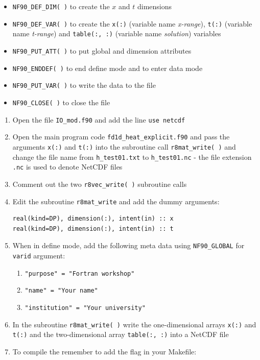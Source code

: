 \documentclass[12pt]{article}
\begin{document}
\begin{enumerate}
\begin{itemize}
\item\texttt{NF90\_DEF\_DIM( )} to create the $x$ and $t$ dimensions
\item\texttt{NF90\_DEF\_VAR( )} to create the \texttt{x(:)} (variable name {\em x-range}), \texttt{t(:)} (variable name
  {\em t-range}) and \texttt{table(:, :)} (variable name {\em solution}) variables
\item\texttt{NF90\_PUT\_ATT( )} to put global and dimension attributes
\item\texttt{NF90\_ENDDEF( )} to end define mode and to enter data mode
\item\texttt{NF90\_PUT\_VAR( )} to write the data to the file
\item\texttt{NF90\_CLOSE( )} to close the file
\end{itemize}
\begin{enumerate}
\item Open the file \texttt{IO\_mod.f90} and add the line \texttt{use netcdf}
\item Open the main program code \texttt{fd1d\_heat\_explicit.f90} and pass the arguments \texttt{x(:)} and
  \texttt{t(:)} into the subroutine call \texttt{r8mat\_write( )} and change the file name from \texttt{h\_test01.txt}
  to \texttt{h\_test01.nc} - the file extension \texttt{.nc} is used to denote NetCDF files
\item Comment out the two \texttt{r8vec\_write( )} subroutine calls
\item Edit the subroutine \texttt{r8mat\_write} and add the dummy arguments:
\begin{verbatim}
real(kind=DP), dimension(:), intent(in) :: x
real(kind=DP), dimension(:), intent(in) :: t
\end{verbatim}
\item When in define mode, add the following meta data using \texttt{NF90\_GLOBAL} for \texttt{varid} argument:
  \begin{enumerate}
  \item\texttt{"purpose" = "Fortran workshop"}
  \item\texttt{"name" = "Your name"}
  \item\texttt{"institution" = "Your university"} 
  \end{enumerate}
\item In the subroutine \texttt{r8mat\_write( )} write the one-dimensional arrays \texttt{x(:)} and \texttt{t(:)} and the
  two-dimensional array \texttt{table(:, :)} into a NetCDF file
\item To compile the remember to add the flag in your Makefile:

\end{enumerate}
\end{enumerate}
\end{document}

